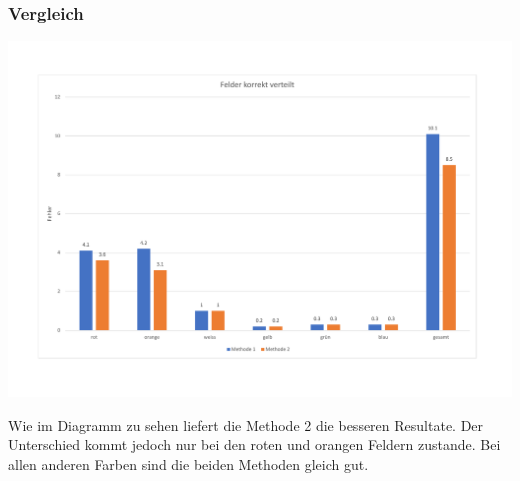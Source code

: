 \documentclass[a4paper, 12pt]{article}
\begin{document}
\subsubsection{Vergleich}

\includegraphics[scale=0.4]{Felder_korrekt_verteilt}

Wie im Diagramm zu sehen liefert die Methode 2 die besseren Resultate. Der Unterschied kommt jedoch nur bei den roten und orangen Feldern zustande. Bei allen anderen Farben sind die beiden Methoden gleich gut. 
\end{document}
